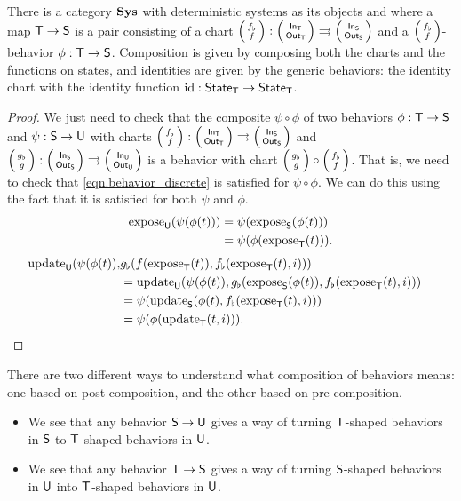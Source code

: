 \documentclass[DynamicalBook]{subfiles}
\begin{document}
\begin{proposition}\label{prop.category_of_systems_discrete}
  There is a category $\textbf{Sys}$ with deterministic systems as its objects and
  where a map $\mathsf{T} \to \mathsf{S}$ is a pair consisting of a chart
  $\lens{f_{\flat}}{f} : \lens{\In{T}}{\Out{T}} \rightrightarrows
  \lens{\In{S}}{\Out{S}}$ and a $\lens{f_{\flat}}{f}$-behavior $\phi : \mathsf{T}
  \to \mathsf{S}$. Composition is given by composing both the charts and the
  functions on states, and identities are given by the generic behaviors: the identity chart with the
  identity function $\mathrm{id} : \mathsf{State}_{\mathsf{T}} \to \mathsf{State}_{\mathsf{T}}$.
\end{proposition}
\begin{proof}
  We just need to check that the composite $\psi \circ \phi$ of two behaviors $\phi : \mathsf{T} \to
  \mathsf{S}$ and $\psi : \mathsf{S} \to \mathsf{U}$ with charts $\lens{f_{\flat}}{f} : \lens{\In{T}}{\Out{T}} \rightrightarrows
  \lens{\In{S}}{\Out{S}}$ and $\lens{g_{\flat}}{g} : \lens{\In{S}}{\Out{S}} \rightrightarrows
  \lens{\In{U}}{\Out{U}}$ is a behavior with chart $\lens{g_{\flat}}{g} \circ
  \lens{f_{\flat}}{f}$. That is, we need to check that
  \cref{eqn.behavior_discrete} is satisfied for $\psi \circ \phi$. We can do
  this using the fact that it is satisfied for both $\psi$ and $\phi$.
  \begin{align*}
    \mathrm{expose}_{\mathsf{U}}(\psi(\phi(t))) &= \psi(\mathrm{expose}_{\mathsf{S}}(\phi(t))) \\
                              &= \psi(\phi(\mathrm{expose}_{\mathsf{T}}(t))).\\
  \end{align*}
  \begin{align*}
    \mathrm{update}_{\mathsf{U}}(\psi(\phi(t)), &g_{\flat}(f(\mathrm{expose}_{\mathsf{T}}(t)), f_{\flat}(\mathrm{expose}_{\mathsf{T}}(t), i)))  \\
                              &=\mathrm{update}_{\mathsf{U}}(\psi(\phi(t)), g_{\flat}(\mathrm{expose}_{\mathsf{S}}(\phi(t)), f_{\flat}(\mathrm{expose}_{\mathsf{T}}(t), i))) \\
                              &= \psi(\mathrm{update}_{\mathsf{S}}(\phi(t), f_{\flat}(\mathrm{expose}_{\mathsf{T}}(t), i))) \\
    &= \psi(\phi(\mathrm{update}_{\mathsf{T}}(t, i))).
    &\qedhere
  \end{align*}
\end{proof}

There are two different ways to understand what composition of behaviors means:
one based on post-composition, and the other based on pre-composition.
\begin{itemize}
  \item We see that any behavior $\mathsf{S} \to \mathsf{U}$ gives a way of turning
    $\mathsf{T}$-shaped behaviors in $\mathsf{S}$ to $\mathsf{T}$-shaped behaviors in $\mathsf{U}$.
  \item We see that any behavior $\mathsf{T} \to \mathsf{S}$ gives a way of turning
    $\mathsf{S}$-shaped behaviors in $\mathsf{U}$ into $\mathsf{T}$-shaped behaviors in $\mathsf{U}$.
\end{itemize}
\end{document}
